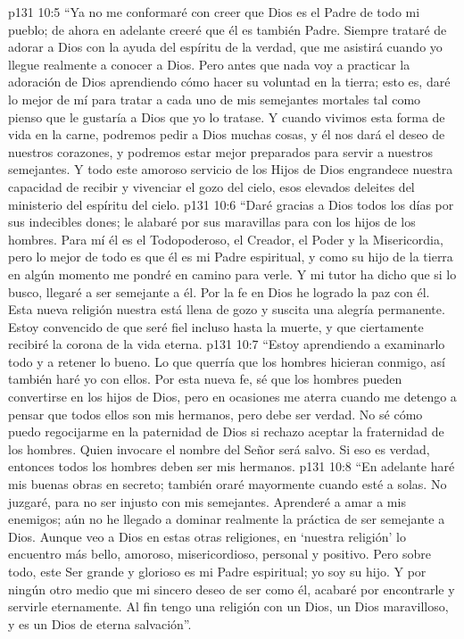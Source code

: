 \vs p131 10:5 “Ya no me conformaré con creer que Dios es el Padre de todo mi pueblo; de ahora en adelante creeré que él es también  Padre. Siempre trataré de adorar a Dios con la ayuda del espíritu de la verdad, que me asistirá cuando yo llegue realmente a conocer a Dios. Pero antes que nada voy a practicar la adoración de Dios aprendiendo cómo hacer su voluntad en la tierra; esto es, daré lo mejor de mí para tratar a cada uno de mis semejantes mortales tal como pienso que le gustaría a Dios que yo lo tratase. Y cuando vivimos esta forma de vida en la carne, podremos pedir a Dios muchas cosas, y él nos dará el deseo de nuestros corazones, y podremos estar mejor preparados para servir a nuestros semejantes. Y todo este amoroso servicio de los Hijos de Dios engrandece nuestra capacidad de recibir y vivenciar el gozo del cielo, esos elevados deleites del ministerio del espíritu del cielo.
\vs p131 10:6 “Daré gracias a Dios todos los días por sus indecibles dones; le alabaré por sus maravillas para con los hijos de los hombres. Para mí él es el Todopoderoso, el Creador, el Poder y la Misericordia, pero lo mejor de todo es que él es mi Padre espiritual, y como su hijo de la tierra en algún momento me pondré en camino para verle. Y mi tutor ha dicho que si lo busco, llegaré a ser semejante a él. Por la fe en Dios he logrado la paz con él. Esta nueva religión nuestra está llena de gozo y suscita una alegría permanente. Estoy convencido de que seré fiel incluso hasta la muerte, y que ciertamente recibiré la corona de la vida eterna.
\vs p131 10:7 “Estoy aprendiendo a examinarlo todo y a retener lo bueno. Lo que querría que los hombres hicieran conmigo, así también haré yo con ellos. Por esta nueva fe, sé que los hombres pueden convertirse en los hijos de Dios, pero en ocasiones me aterra cuando me detengo a pensar que todos ellos son mis hermanos, pero debe ser verdad. No sé cómo puedo regocijarme en la paternidad de Dios si rechazo aceptar la fraternidad de los hombres. Quien invocare el nombre del Señor será salvo. Si eso es verdad, entonces todos los hombres deben ser mis hermanos.
\vs p131 10:8 “En adelante haré mis buenas obras en secreto; también oraré mayormente cuando esté a solas. No juzgaré, para no ser injusto con mis semejantes. Aprenderé a amar a mis enemigos; aún no he llegado a dominar realmente la práctica de ser semejante a Dios. Aunque veo a Dios en estas otras religiones, en ‘nuestra religión’ lo encuentro más bello, amoroso, misericordioso, personal y positivo. Pero sobre todo, este Ser grande y glorioso es mi Padre espiritual; yo soy su hijo. Y por ningún otro medio que mi sincero deseo de ser como él, acabaré por encontrarle y servirle eternamente. Al fin tengo una religión con un Dios, un Dios maravilloso, y es un Dios de eterna salvación”.
